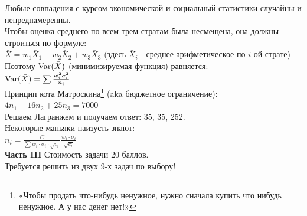\documentclass[12pt, a4paper]{article}\usepackage[]{graphicx}\usepackage[]{color}
\begin{document}
Любые совпадения с курсом экономической и социальный статистики случайны и непреднамеренны. \\
Чтобы оценка среднего по всем трем стратам была несмещена, она должны строиться по формуле: \\
$\bar{X}=w_{1}\bar{X}_{1}+w_{2}\bar{X}_{2}+w_{3}\bar{X}_{3}$ (здесь $\bar{X}_{i}$ - среднее арифметическое по $i$-ой страте) \\
Поэтому $\operatorname{Var}(\bar{X})$ (минимизируемая функция) равняется: \\
$\operatorname{Var}(\bar{X})=\sum \frac{w^{2}_{i}\sigma^{2}_{i}}{n_{i}}$ \\
Принцип кота Матроскина\footnote{«Чтобы продать что-нибудь ненужное, нужно сначала купить что нибудь ненужное. А у нас денег нет!»} (aka бюджетное ограничение):  $4n_{1}+16n_{2}+25n_{3}=7000$ \\
Решаем Лагранжем и получаем ответ: 35, 35, 252. \\
Некоторые маньяки наизусть знают: \\
$n_{i}=\frac{C}{\sum w_{i}\cdot \sigma_{i}\cdot\sqrt{c_{i}}}\frac{w_{i}\cdot \sigma_{i}}{\sqrt{c_{i}}}$\\






\textbf{Часть III} Стоимость задачи 20 баллов. \\

Требуется решить \textbf{} из двух 9-х задач по
выбору! \\
\end{document}
